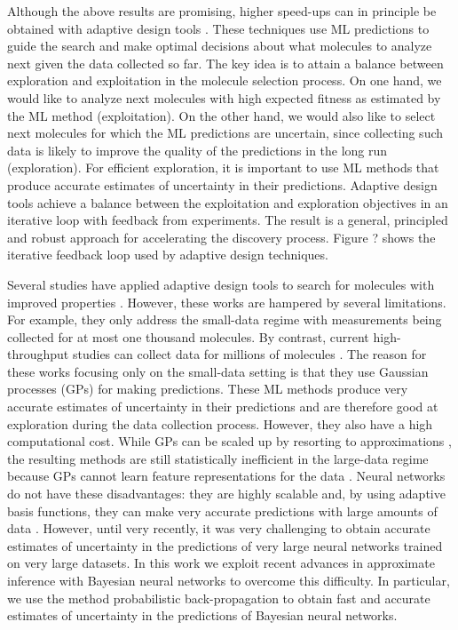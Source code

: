 Although the above results are promising, higher speed-ups can in principle be
obtained with adaptive design tools \cite{jones1998efficient}. These techniques
use ML predictions to guide the search and make optimal decisions about what
molecules to analyze next given the data collected so far. The key idea is to
attain a balance between exploration and exploitation in the molecule selection
process. On one hand, we would like to analyze next molecules with high
expected fitness as estimated by the ML method (exploitation). On the other
hand, we would also like to select next molecules for which the ML predictions
are uncertain, since collecting such data is likely to improve the quality of
the predictions in the long run (exploration). For efficient
exploration, it is important to use ML methods that produce accurate
estimates of uncertainty in their predictions. 
Adaptive design tools achieve a balance
between the exploitation and exploration objectives in an iterative loop with
feedback from experiments. 
The result is a general, principled and robust
approach for accelerating the discovery process. 
Figure ? shows the iterative
feedback loop used by adaptive design techniques.

Several studies have applied adaptive design tools to search for
molecules with improved properties \cite{Xue_2016,Negoescu_2011,De_Grave_2008}. However, these
works are hampered by several limitations. For example, they only
address the small-data regime with measurements being collected for at most one
thousand molecules. By contrast, current high-throughput studies can collect data for
millions of molecules \cite{Hachmann_2011}. The reason for these works focusing only on
the small-data setting is that they 
use Gaussian processes (GPs) \cite{rasmussen2006gaussian} for making predictions. These ML methods
produce very accurate estimates of uncertainty in their predictions and are therefore 
good at exploration during the data collection process.
However, they also have a high computational
cost. While GPs can be scaled up by resorting to approximations 
\cite{snelson2005sparse,hensman2015scalable}, the resulting methods are still
statistically inefficient in the large-data regime because GPs cannot learn
feature representations for the data \cite{bengio2007scaling}.
Neural networks do not have these disadvantages: they are highly scalable and,
by using adaptive basis functions, they can make very accurate predictions with
large amounts of data \cite{lecun2015deep}. However, until very recently, it was very
challenging to obtain accurate estimates of uncertainty in the predictions of very large
neural networks trained on very large datasets. In this work we exploit
recent advances in approximate inference with Bayesian neural networks to overcome this difficulty. 
In particular, we use the method probabilistic back-propagation \cite{Hernandez-Lobato15b} to obtain fast
and accurate estimates of uncertainty in the predictions of Bayesian neural networks.

